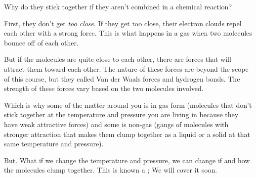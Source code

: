 Why do they stick together if they aren't combined in a chemical reaction?

First, they don't get \emph{too close}.  If they get too close,  their electron clouds repel each other with a strong force.  
This is what happens in a gas when two molecules bounce off of each other.

But if the molecules are quite close to each other,  there are forces that will attract them toward each other.  
The nature of these forces are beyond the scope of this course, but they called Van der Waals forces and hydrogen bonds.   
The strength of these forces vary based on the two molecules involved. 

Which is why some of the matter around you is in gas form (molecules that don't stick together at the temperature and pressure you are living in because they have weak attractive forces) and some is non-gas 
(gangs of molecules with stronger attraction that makes them clump together as a liquid or a solid at that same temperature and pressure).

But.  What if we change the temperature and pressure,  we can change if and how the molecules clump together.  
This is known a ; We will cover it soon.